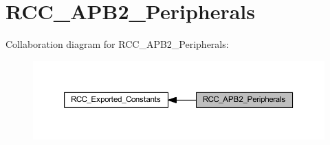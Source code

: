 \hypertarget{group___r_c_c___a_p_b2___peripherals}{}\section{R\+C\+C\+\_\+\+A\+P\+B2\+\_\+\+Peripherals}
\label{group___r_c_c___a_p_b2___peripherals}
Collaboration diagram for R\+C\+C\+\_\+\+A\+P\+B2\+\_\+\+Peripherals\+:\nopagebreak
\begin{figure}[H]
\begin{center}
\leavevmode
\includegraphics[width=350pt]{group___r_c_c___a_p_b2___peripherals}
\end{center}
\end{figure}
